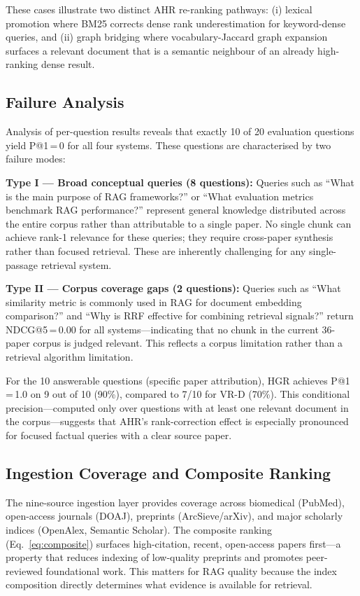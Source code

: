 \documentclass[conference,10pt,twocolumn]{IEEEtran}
\begin{document}
These cases illustrate two distinct AHR re-ranking pathways: (i) lexical promotion where BM25 corrects dense rank underestimation for keyword-dense queries, and (ii) graph bridging where vocabulary-Jaccard graph expansion surfaces a relevant document that is a semantic neighbour of an already high-ranking dense result.

\subsection{Failure Analysis}

Analysis of per-question results reveals that exactly 10 of 20 evaluation questions yield P@1\,=\,0 for all four systems. These questions are characterised by two failure modes:

\textbf{Type I --- Broad conceptual queries (8 questions):} Queries such as ``What is the main purpose of RAG frameworks?'' or ``What evaluation metrics benchmark RAG performance?'' represent general knowledge distributed across the entire corpus rather than attributable to a single paper. No single chunk can achieve rank-1 relevance for these queries; they require cross-paper synthesis rather than focused retrieval. These are inherently challenging for any single-passage retrieval system.

\textbf{Type II --- Corpus coverage gaps (2 questions):} Queries such as ``What similarity metric is commonly used in RAG for document embedding comparison?'' and ``Why is RRF effective for combining retrieval signals?'' return NDCG@5\,=\,0.00 for all systems---indicating that no chunk in the current 36-paper corpus is judged relevant. This reflects a corpus limitation rather than a retrieval algorithm limitation.

For the 10 answerable questions (specific paper attribution), HGR achieves P@1\,=\,1.0 on 9 out of 10 (90\%), compared to 7/10 for VR-D (70\%). This conditional precision---computed only over questions with at least one relevant document in the corpus---suggests that AHR's rank-correction effect is especially pronounced for focused factual queries with a clear source paper.

\subsection{Ingestion Coverage and Composite Ranking}

The nine-source ingestion layer provides coverage across biomedical (PubMed), open-access journals (DOAJ), preprints (ArcSieve/arXiv), and major scholarly indices (OpenAlex, Semantic Scholar). The composite ranking (Eq.~\ref{eq:composite}) surfaces high-citation, recent, open-access papers first---a property that reduces indexing of low-quality preprints and promotes peer-reviewed foundational work. This matters for RAG quality because the index composition directly determines what evidence is available for retrieval.
\end{document}
